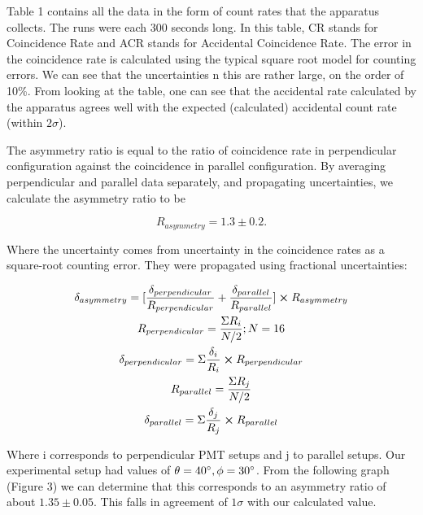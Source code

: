 \documentclass{article}
\begin{document}
Table 1 contains all the data in the form of count rates that the apparatus collects. The runs were each 300 seconds long. In this table, CR stands for Coincidence Rate and ACR stands for Accidental Coincidence Rate. The error in the coincidence rate is calculated using the typical square root model for counting errors. We can see that the uncertainties n this are rather large, on the order of 10\%. From looking at the table, one can see that the accidental rate calculated by the apparatus agrees well with the expected (calculated) accidental count rate (within $2\sigma$).

\hspace{.25cm}

The asymmetry ratio is equal to the ratio of coincidence rate in perpendicular configuration against the coincidence in parallel configuration. By averaging perpendicular and parallel data separately, and propagating uncertainties, we calculate the asymmetry ratio to be

\begin{equation}
	R_{asymmetry} = 1.3 \pm 0.2.
\end{equation}

Where the uncertainty comes from uncertainty in the coincidence rates as a square-root counting error. They were propagated using fractional uncertainties:

\begin{gather}
	\delta_{asymmetry} = [\frac{\delta_{perpendicular}}{R_{perpendicular}} + \frac{\delta_{parallel}}{R_{parallel}}] \cross R_{asymmetry} \\
	R_{perpendicular} = \frac{\Sigma R_i}{N/2}; N=16 \\
	\delta_{perpendicular} = \Sigma \frac{\delta_i}{R_i} \cross R_{perpendicular} \\
	R_{parallel} = \frac{\Sigma R_j}{N/2} \\
	\delta_{parallel} = \Sigma \frac{\delta_j}{R_j} \cross R_{parallel}
\end{gather}

\hspace{.25cm}

Where i corresponds to perpendicular PMT setups and j to parallel setups.
Our experimental setup had values of $\theta = 40\degree, \phi = 30\degree$. From the following graph (Figure 3) we can determine that this corresponds to an asymmetry ratio of about $1.35 \pm 0.05$. This falls in agreement of $1\sigma$ with our calculated value.
\end{document}
